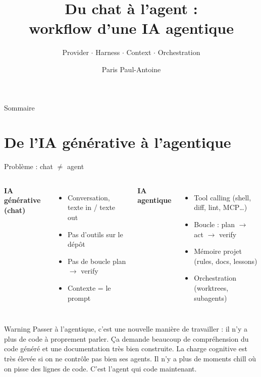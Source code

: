 \documentclass[aspectratio=169]{beamer}
\title[IA gen $\rightarrow$ Agentique]{Du chat à l'agent :\\workflow d'une IA agentique}
\subtitle{Provider $\cdot$ Harness $\cdot$ Context $\cdot$ Orchestration}
\author[]{Paris Paul-Antoine}
\institute[]{Orange}
\date{}
\begin{document}
\begin{frame}
    \titlepage
\end{frame}

\begin{frame}{Sommaire}
    \tableofcontents
\end{frame}

\section{De l'IA générative à l'agentique}

\begin{frame}{Problème : chat $\neq$ agent}
    \begin{columns}[T]
        \textbf{IA générative (chat)}
        \begin{itemize}
            \item Conversation, texte in / texte out
            \item Pas d'outils sur le dépôt
            \item Pas de boucle plan $\rightarrow$ verify
            \item Contexte = le prompt
        \end{itemize}
        \textbf{IA agentique}
        \begin{itemize}
            \item Tool calling (shell, diff, lint, MCP\dots)
            \item Boucle : plan $\rightarrow$ act $\rightarrow$ verify
            \item Mémoire projet (rules, docs, lessons)
            \item Orchestration (worktrees, subagents)
        \end{itemize}
    \end{columns}
    \vspace{0.6cm}
    \begin{block}{Warning}
        Passer à l'agentique, c'est une nouvelle manière de travailler : il n'y a plus de code à proprement parler.
        Ça demande beaucoup de compréhension du code généré et une documentation très bien construite.
        La charge cognitive est très élevée si on ne contrôle pas bien ses agents.
        Il n'y a plus de moments chill où on pisse des lignes de code. C'est l'agent qui code maintenant.
    \end{block}
\end{frame}
\end{document}
